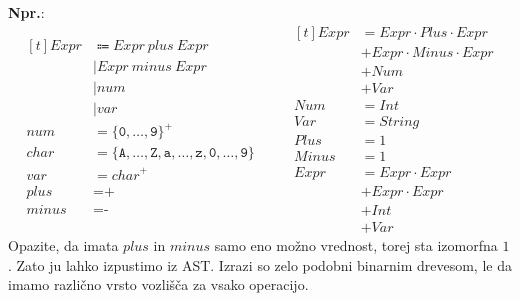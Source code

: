 \documentclass{report}
\newcommand{\Ex}{\textbf{Npr.}:\ }
\newcommand{\Char}[1]{\texttt{#1}}
\newcommand{\Seq}{\cdot}
\newcommand{\Spc}{\ }
\newcommand{\Union}{\mathrel{|}}
\newcommand{\Sum}{\mathrel{+}}
\newcommand{\KleenePlus}[1]{#1^+}
\newcommand{\Arrow}{\Coloneq}
\newcommand{\NT}[1]{{#1}}
\newcommand{\T}[1]{{#1}}
\begin{document}
\Ex
\begin{equation*}
  \begin{aligned}[t]
    \NT{Expr} &\Arrow \NT{Expr} \Spc \T{plus} \Spc \NT{Expr} \\
    &\Union \NT{Expr} \Spc \T{minus} \Spc \NT{Expr} \\
    &\Union \T{num}\\
    &\Union \T{var}\\[1em]
    \T{num} &= \KleenePlus{\{\Char{0}, \dots, \Char{9}\}}\\
    \T{char} &= \{\Char{A}, \dots, \Char{Z}, \Char{a}, \dots, \Char{z}, \Char{0}, \dots, \Char{9} \}\\
    \T{var} &= \KleenePlus{\T{char}}\\
    \T{plus} &= \Char{+}\\
    \T{minus} &= \Char{-}\\
  \end{aligned}
  \qquad
  \begin{aligned}[t]
    Expr &= Expr \Seq Plus \Seq Expr \\
    &\Sum Expr \Seq Minus \Seq Expr \\
    &\Sum Num\\
    &\Sum Var\\
    Num &= Int\\
    Var &= String\\
    Plus &= 1\\
    Minus &= 1\\[1em]
    Expr &= Expr \Seq Expr \\
    &\Sum Expr \Seq Expr \\
    &\Sum Int\\
    &\Sum Var
  \end{aligned}
\end{equation*}
Opazite, da imata $\T{plus}$ in $\T{minus}$ samo eno možno vrednost, torej sta izomorfna $1$.
Zato ju lahko izpustimo iz AST.
Izrazi so zelo podobni binarnim drevesom, le da imamo različno vrsto vozlišča za vsako operacijo.
\end{document}
